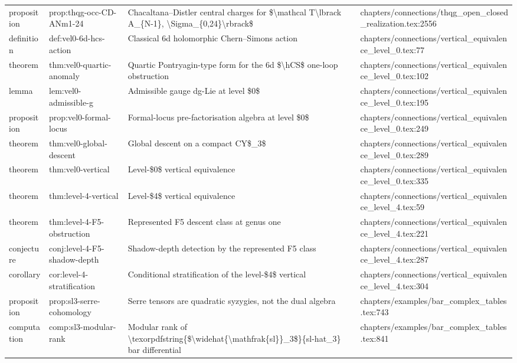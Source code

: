 \documentclass[11pt]{article}
\begin{document}
\begin{longtable}{L{0.10\textwidth}L{0.26\textwidth}L{0.42\textwidth}L{0.22\textwidth}}
proposition & prop:thqg-occ-CD-ANm1-24 & Chacaltana--Distler central charges for \$\textbackslash{}mathcal T\textbackslash{}lbrack A\_\{N-1\}, \textbackslash{}Sigma\_\{0,24\}\textbackslash{}rbrack\$ & chapters/connections/thqg\_op{}en\_closed\_realization.tex:2556\\
definition & def:vel0-6d-hcs-action & Classical 6d holomorphic Chern--Simons action & chapters/connections/vertical\_equivalence\_level\_0.tex:77\\
theorem & thm:vel0-quartic-anomaly & Quartic Pontryagin-type form for the 6d \$\textbackslash{}hCS\$ one-loop obstruction & chapters/connections/vertical\_equivalence\_level\_0.tex:102\\
lemma & lem:vel0-admissible-g & Admissible gauge dg-Lie at level \$0\$ & chapters/connections/vertical\_equivalence\_level\_0.tex:195\\
proposition & prop:vel0-formal-locus & Formal-locus pre-factorisation algebra at level \$0\$ & chapters/connections/vertical\_equivalence\_level\_0.tex:249\\
theorem & thm:vel0-global-descent & Global descent on a compact CY\$\_3\$ & chapters/connections/vertical\_equivalence\_level\_0.tex:289\\
theorem & thm:vel0-vertical & Level-\$0\$ vertical equivalence & chapters/connections/vertical\_equivalence\_level\_0.tex:335\\
theorem & thm:level-4-vertical & Level-\$4\$ vertical equivalence & chapters/connections/vertical\_equivalence\_level\_4.tex:59\\
theorem & thm:level-4-F5-obstruction & Represented F5 descent class at genus one & chapters/connections/vertical\_equivalence\_level\_4.tex:221\\
conjecture & conj:level-4-F5-shadow-depth & Shadow-depth detection by the represented F5 class & chapters/connections/vertical\_equivalence\_level\_4.tex:287\\
corollary & cor:level-4-stratification & Cond{}itional stratification of the level-\$4\$ vertical & chapters/connections/vertical\_equivalence\_level\_4.tex:304\\
proposition & prop:sl3-serre-cohomology & Serre tensors are quadratic syzygies, not the dual algebra & chapters/examples/bar\_complex\_tables.tex:743\\
computation & comp:sl3-modular-rank & Modular rank of \textbackslash{}texorpdfstring\{\$\textbackslash{}widehat\{\textbackslash{}mathfrak\{sl\}\}\_3\$\}\{sl-hat\_3\} bar differential & chapters/examples/bar\_complex\_tables.tex:841\\

\end{longtable}
\end{document}

